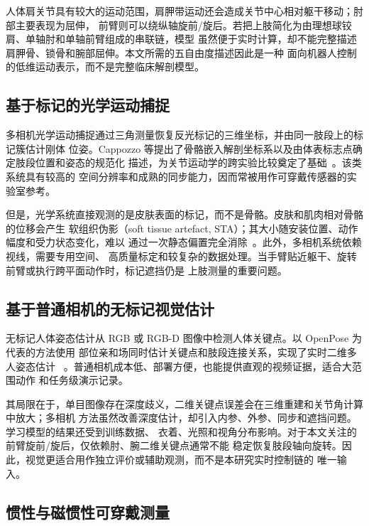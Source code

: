 人体肩关节具有较大的运动范围，肩胛带运动还会造成关节中心相对躯干移动；肘部主要表现为屈伸，
前臂则可以绕纵轴旋前/旋后。若把上肢简化为由理想球铰肩、单轴肘和单轴前臂组成的串联链，模型
虽然便于实时计算，却不能完整描述肩胛骨、锁骨和腕部屈伸。本文所需的五自由度描述因此是一种
面向机器人控制的低维运动表示，而不是完整临床解剖模型。

\subsection{基于标记的光学运动捕捉}
\label{subsec:ch2_marker_mocap}

多相机光学运动捕捉通过三角测量恢复反光标记的三维坐标，并由同一肢段上的标记簇估计刚体
位姿。Cappozzo 等提出了骨骼嵌入解剖坐标系以及由体表标志点确定肢段位置和姿态的规范化
描述，为关节运动学的跨实验比较奠定了基础~\cite{cappozzo1995position}。该类系统具有较高的
空间分辨率和成熟的同步能力，因而常被用作可穿戴传感器的实验室参考。

但是，光学系统直接观测的是皮肤表面的标记，而不是骨骼。皮肤和肌肉相对骨骼的位移会产生
软组织伪影（soft tissue artefact, STA）；其大小随安装位置、动作幅度和受力状态变化，难以
通过一次静态偏置完全消除~\cite{leardini2005soft}。此外，多相机系统依赖视线，需要专用空间、
高质量标定和较复杂的数据处理。当手臂贴近躯干、旋转前臂或执行跨平面动作时，标记遮挡仍是
上肢测量的重要问题。

\subsection{基于普通相机的无标记视觉估计}
\label{subsec:ch2_markerless_vision}

无标记人体姿态估计从 RGB 或 RGB-D 图像中检测人体关键点。以 OpenPose 为代表的方法使用
部位亲和场同时估计关键点和肢段连接关系，实现了实时二维多人姿态估计
~\cite{cao2017realtime}。普通相机成本低、部署方便，也能提供直观的视频证据，适合大范围动作
和任务级演示记录。

其局限在于，单目图像存在深度歧义，二维关键点误差会在三维重建和关节角计算中放大；多相机
方法虽然改善深度估计，却引入内参、外参、同步和遮挡问题。学习模型的结果还受到训练数据、
衣着、光照和视角分布影响。对于本文关注的前臂旋前/旋后，仅依赖肘、腕二维关键点通常不能
稳定恢复肢段轴向旋转。因此，视觉更适合用作独立评价或辅助观测，而不是本研究实时控制链的
唯一输入。

\subsection{惯性与磁惯性可穿戴测量}
\label{subsec:ch2_imu}

